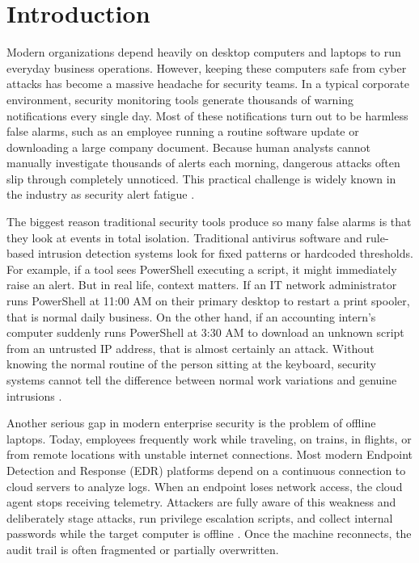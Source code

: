 \documentclass[conference]{IEEEtran}
\begin{document}
\section{Introduction}
Modern organizations depend heavily on desktop computers and laptops to run everyday business operations. However, keeping these computers safe from cyber attacks has become a massive headache for security teams. In a typical corporate environment, security monitoring tools generate thousands of warning notifications every single day. Most of these notifications turn out to be harmless false alarms, such as an employee running a routine software update or downloading a large company document. Because human analysts cannot manually investigate thousands of alerts each morning, dangerous attacks often slip through completely unnoticed. This practical challenge is widely known in the industry as security alert fatigue \cite{forrest2008evolution, garcia2009anomaly}.

The biggest reason traditional security tools produce so many false alarms is that they look at events in total isolation. Traditional antivirus software and rule-based intrusion detection systems look for fixed patterns or hardcoded thresholds. For example, if a tool sees PowerShell executing a script, it might immediately raise an alert. But in real life, context matters. If an IT network administrator runs PowerShell at 11:00 AM on their primary desktop to restart a print spooler, that is normal daily business. On the other hand, if an accounting intern's computer suddenly runs PowerShell at 3:30 AM to download an unknown script from an untrusted IP address, that is almost certainly an attack. Without knowing the normal routine of the person sitting at the keyboard, security systems cannot tell the difference between normal work variations and genuine intrusions \cite{kruegel2003host, yeung2002host}.

Another serious gap in modern enterprise security is the problem of offline laptops. Today, employees frequently work while traveling, on trains, in flights, or from remote locations with unstable internet connections. Most modern Endpoint Detection and Response (EDR) platforms depend on a continuous connection to cloud servers to analyze logs. When an endpoint loses network access, the cloud agent stops receiving telemetry. Attackers are fully aware of this weakness and deliberately stage attacks, run privilege escalation scripts, and collect internal passwords while the target computer is offline \cite{han2016pidas}. Once the machine reconnects, the audit trail is often fragmented or partially overwritten.
\end{document}

